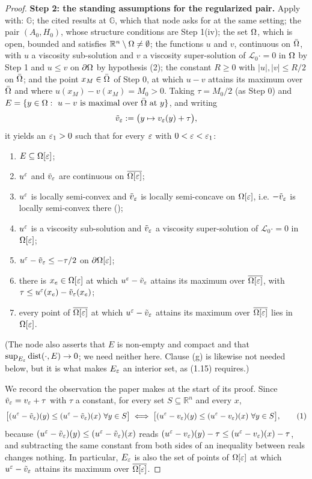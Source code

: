 \begin{proof}
\medskip\noindent\textbf{Step 2: the standing assumptions for the regularized pair.} Apply
 with: $\mathbb G$; the cited results at
$\mathbb G$, which that node asks for at the same setting; the pair
$(A_0,H_0)$, whose structure conditions are Step 1(iv); the set $\Omega$, which is open,
bounded and satisfies $\mathbb R^{n}\setminus\Omega\ne\emptyset$; the functions $u$ and $v$,
continuous on $\bar{\Omega}$, with $u$ a viscosity sub-solution and $v$ a viscosity
super-solution of $\mathcal L_0\cdot=0$ in $\Omega$ by Step 1 and $u\le v$ on $\partial\Omega$ by
hypothesis (2); the constant $R\ge0$ with $|u|,|v|\le R/2$ on $\bar{\Omega}$; and the point
$x_M\in\bar{\Omega}$ of Step 0, at which $u-v$ attains its maximum over $\bar{\Omega}$ and where
$u(x_M)-v(x_M)=M_0>0$. Taking $\tau=M_0/2$ (as Step 0) and
$E=\{y\in\Omega:\ u-v\ \text{is maximal over}\ \bar{\Omega}\ \text{at}\ y\}$, and writing
\[
 \tilde v_{\varepsilon}:=\big(y\mapsto v_{\varepsilon}(y)+\tau\big),
\]
it yields an $\varepsilon_1>0$ such that for every $\varepsilon$ with $0<\varepsilon<\varepsilon_1$:
\begin{enumerate}
\item[(a)] $E\subseteq\Omega[\varepsilon]$;
\item[(b)] $u^{\varepsilon}$ and $\tilde v_{\varepsilon}$ are continuous on $\overline{\Omega[\varepsilon]}$;
\item[(c)] $u^{\varepsilon}$ is locally semi-convex and $\tilde v_{\varepsilon}$ is locally semi-concave on
  $\Omega[\varepsilon]$, i.e. $-\tilde v_{\varepsilon}$ is locally semi-convex there
  ();
\item[(d)] $u^{\varepsilon}$ is a viscosity sub-solution and $\tilde v_{\varepsilon}$ a viscosity
  super-solution of $\mathcal L_0\cdot=0$ in $\Omega[\varepsilon]$;
\item[(e)] $u^{\varepsilon}-\tilde v_{\varepsilon}\le-\tau/2$ on $\partial\Omega[\varepsilon]$;
\item[(f)] there is $x_e\in\Omega[\varepsilon]$ at which $u^{\varepsilon}-\tilde v_{\varepsilon}$ attains its maximum
  over $\overline{\Omega[\varepsilon]}$, with $\tau\le u^{\varepsilon}(x_e)-\tilde v_{\varepsilon}(x_e)$;
\item[(g)] every point of $\overline{\Omega[\varepsilon]}$ at which $u^{\varepsilon}-\tilde v_{\varepsilon}$ attains
  its maximum over $\overline{\Omega[\varepsilon]}$ lies in $\Omega[\varepsilon]$.
\end{enumerate}
(The node also asserts that $E$ is non-empty and compact and that
$\sup_{E_\varepsilon}\operatorname{dist}(\cdot,E)\to0$; we need neither here. Clause (g) is likewise not needed
below, but it is what makes $E_\varepsilon$ an interior set, as (1.15) requires.)

We record the observation the paper makes at the start of its proof. Since
$\tilde v_{\varepsilon}=v_{\varepsilon}+\tau$ with $\tau$ a constant, for every set
$S\subseteq\mathbb R^{n}$ and every $x$,
\[
 \big[(u^{\varepsilon}-\tilde v_{\varepsilon})(y)\le(u^{\varepsilon}-\tilde v_{\varepsilon})(x)\ \forall y\in S\big]
 \iff
 \big[(u^{\varepsilon}-v_{\varepsilon})(y)\le(u^{\varepsilon}-v_{\varepsilon})(x)\ \forall y\in S\big], \tag{1}
\]
because $(u^{\varepsilon}-\tilde v_{\varepsilon})(y)\le(u^{\varepsilon}-\tilde v_{\varepsilon})(x)$ reads
$(u^{\varepsilon}-v_{\varepsilon})(y)-\tau\le(u^{\varepsilon}-v_{\varepsilon})(x)-\tau$, and subtracting the same
constant from both sides of an inequality between reals changes nothing. In particular,
$E_\varepsilon$ is also the set of points of $\Omega[\varepsilon]$ at which $u^{\varepsilon}-\tilde v_{\varepsilon}$
attains its maximum over $\overline{\Omega[\varepsilon]}$.


\end{proof}
